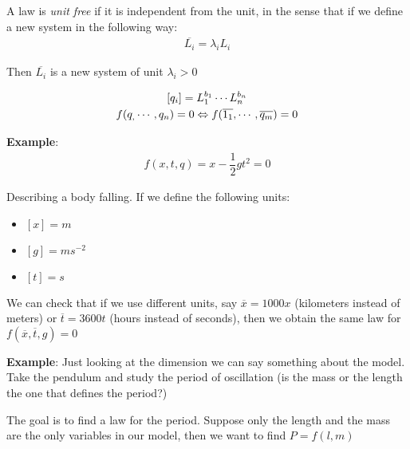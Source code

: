 \begin{theo}{}
  A law is \textit{unit free} if it is independent from the unit, in the sense that if we define a new system in the following way:
  \begin{equation*}
    \begin{gathered}
      \overline{L_i} = \lambda_i L_i
    \end{gathered}
  \end{equation*}\par
  \noindent Then $\overline{L_i}$ is a new system of unit $\lambda_i>0$
  \par\bigskip
  \begin{equation*}
    \begin{gathered}
      [q_i] = L_1^{b_1}\cdots L_n^{b_n}\\
      f(q_,\cdots,q_n) = 0\Lrarr f(\overline{1_1},\cdots,\overline{q_m}) = 0
    \end{gathered}
  \end{equation*}
\end{theo}
\par\bigskip
\noindent\textbf{Example}:
\begin{equation*}
  \begin{gathered}
    f(x,t,q) = x-\dfrac{1}{2}gt^2 = 0
  \end{gathered}
\end{equation*}\par
\noindent Describing a body falling. If we define the following units:\par
\begin{itemize}
  \item $[x] = m$
  \item $[g] = ms^{-2}$
  \item$[t] = s$
\end{itemize}\par
\noindent We can check that if we use different units, say $\overline{x} = 1000x$ (kilometers instead of meters) or $\overline{t} = 3600t$ (hours instead of seconds), then we obtain the same law for $f(\overline{x}, \overline{t}, g) = 0$
\par\bigskip
\noindent\textbf{Example}: Just looking at the dimension we can say something about the model. Take the pendulum and study the period of oscillation (is the mass or the length the one that defines the period?)
\par\bigskip
\noindent The goal is to find a law for the period. Suppose only the length and the mass are the only variables in our model, then we want to find $P = f(l,m)$\par
